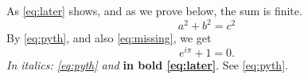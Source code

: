 \documentclass{article}
\begin{document}
As \eqref{eq:later} shows, and as we prove below, the sum is finite.
\begin{equation}
  a^2 + b^2 = c^2 \label{eq:pyth}
\end{equation}
By \eqref{eq:pyth}, and also \eqref{eq:missing}, we get
\begin{equation}
  e^{i\pi} + 1 = 0. \label{eq:later}
\end{equation}
\textit{In italics: \eqref{eq:pyth} and} \textbf{in bold \eqref{eq:later}}. See \eqref{eq:pyth}.
\end{document}
